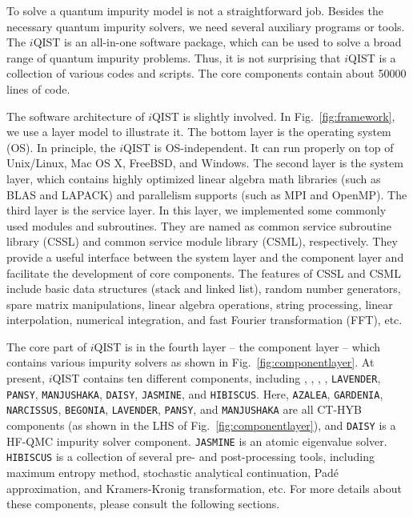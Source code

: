 To solve a quantum impurity model is not a straightforward job. Besides the necessary quantum impurity solvers, we need several auxiliary programs or tools. The $i$QIST is an all-in-one software package, which can be used to solve a broad range of quantum impurity problems. Thus, it is not surprising that $i$QIST is a collection of various codes and scripts. The core components contain about 50000 lines of code. 

The software architecture of $i$QIST is slightly involved. In Fig.~\ref{fig:framework}, we use a layer model to illustrate it. The bottom layer is the operating system (OS). In principle, the $i$QIST is OS-independent. It can run properly on top of Unix/Linux, Mac OS X, FreeBSD, and Windows. The second layer is the system layer, which contains highly optimized linear algebra math libraries (such as BLAS and LAPACK) and parallelism supports (such as MPI and OpenMP). The third layer is the service layer. In this layer, we implemented some commonly used modules and subroutines. They are named as common service subroutine library (CSSL) and common service module library (CSML), respectively. They provide a useful interface between the system layer and the component layer and facilitate the development of core components. The features of CSSL and CSML include basic data structures (stack and linked list), random number generators, spare matrix manipulations, linear algebra operations, string processing, linear interpolation, numerical integration, and fast Fourier transformation (FFT), etc. 

The core part of $i$QIST is in the fourth layer -- the component layer -- which contains various impurity solvers as shown in Fig.~\ref{fig:componentlayer}. At present, $i$QIST contains ten different components, including {\azalea}, {\gardenia}, {\narcissus}, {\begonia}, \texttt{LAVENDER}, \texttt{PANSY}, \texttt{MANJUSHAKA}, \texttt{DAISY}, \texttt{JASMINE}, and \texttt{HIBISCUS}. Here, \texttt{AZALEA}, \texttt{GARDENIA}, \texttt{NARCISSUS}, \texttt{BEGONIA}, \texttt{LAVENDER}, \texttt{PANSY}, and \texttt{MANJUSHAKA} are all CT-HYB components (as shown in the LHS of Fig.~\ref{fig:componentlayer}), and \texttt{DAISY} is a HF-QMC impurity solver component. \texttt{JASMINE} is an atomic eigenvalue solver. \texttt{HIBISCUS} is a collection of several pre- and post-processing tools, including maximum entropy method, stochastic analytical continuation, Pad\'{e} approximation, and Kramers-Kronig transformation, etc. For more details about these components, please consult the following sections. 

